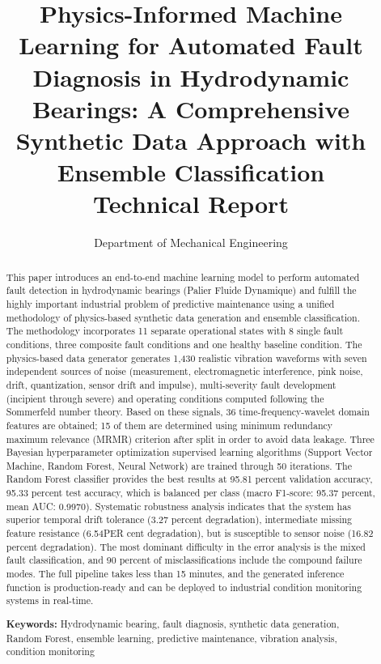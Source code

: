 \documentclass[11pt,a4paper]{article}
\title{\textbf{Physics-Informed Machine Learning for Automated Fault Diagnosis in Hydrodynamic Bearings: A Comprehensive Synthetic Data Approach with Ensemble Classification}\\
\vspace{0.5em}
\large Technical Report}
\author{Department of Mechanical Engineering}
\date{}
\begin{document}
\maketitle

\begin{abstract}
This paper introduces an end-to-end machine learning model to perform automated fault detection in hydrodynamic bearings (Palier Fluide Dynamique) and fulfill the highly important industrial problem of predictive maintenance using a unified methodology of physics-based synthetic data generation and ensemble classification. The methodology incorporates 11 separate operational states with 8 single fault conditions, three composite fault conditions and one healthy baseline condition. The physics-based data generator generates 1,430 realistic vibration waveforms with seven independent sources of noise (measurement, electromagnetic interference, pink noise, drift, quantization, sensor drift and impulse), multi-severity fault development (incipient through severe) and operating conditions computed following the Sommerfeld number theory. Based on these signals, 36 time-frequency-wavelet domain features are obtained; 15 of them are determined using minimum redundancy maximum relevance (MRMR) criterion after split in order to avoid data leakage. Three Bayesian hyperparameter optimization supervised learning algorithms (Support Vector Machine, Random Forest, Neural Network) are trained through 50 iterations. The Random Forest classifier provides the best results at 95.81 percent validation accuracy, 95.33 percent test accuracy, which is balanced per class (macro F1-score: 95.37 percent, mean AUC: 0.9970). Systematic robustness analysis indicates that the system has superior temporal drift tolerance (3.27 percent degradation), intermediate missing feature resistance (6.54PER cent degradation), but is susceptible to sensor noise (16.82 percent degradation). The most dominant difficulty in the error analysis is the mixed fault classification, and 90 percent of misclassifications include the compound failure modes. The full pipeline takes less than 15 minutes, and the generated inference function is production-ready and can be deployed to industrial condition monitoring systems in real-time.

\textbf{Keywords:} Hydrodynamic bearing, fault diagnosis, synthetic data generation, Random Forest, ensemble learning, predictive maintenance, vibration analysis, condition monitoring
\end{abstract}
\newpage
\tableofcontents
\end{document}
